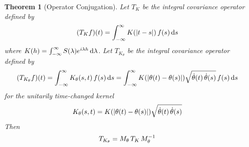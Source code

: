 \documentclass{article}
\newtheorem{theorem}{Theorem}
\begin{document}
\begin{theorem}[Operator Conjugation]
  \label{thm:operator_conjugation}Let $T_K$ be the integral covariance
  operator defined by
  \begin{equation}
    \label{eq:integral_op_original} (T_K f) (t) = \int_{- \infty}^{\infty} K
    (|t - s|)  \hspace{0.17em} f (s) \hspace{0.17em} \mathrm{d} s
  \end{equation}
  where $K (h) = \int_{- \infty}^{\infty} S (\lambda) e^{i \lambda h}
  \hspace{0.17em} \mathrm{d} \lambda$. Let $T_{K_{\theta}}$ be the integral
  covariance operator defined by
  \begin{equation}
    \label{eq:integral_op_transformed} (T_{K_{\theta}} f) (t) = \int_{-
    \infty}^{\infty} K_{\theta} (s, t)  \hspace{0.17em} f (s) \hspace{0.17em}
    \mathrm{d} s = \int_{- \infty}^{\infty} K (| \theta (t) - \theta (s) |)
    \sqrt{\dot{\theta} (t)  \hspace{0.17em} \dot{\theta} (s)}  \hspace{0.17em}
    f (s) \hspace{0.17em} \mathrm{d} s
  \end{equation}
  for the unitarily time-changed kernel
  \begin{equation}
    K_{\theta} (s, t) = K (| \theta (t) - \theta (s) |) \sqrt{\dot{\theta} (t)
    \hspace{0.17em} \dot{\theta} (s)}
  \end{equation}
  Then
  \begin{equation}
    \label{eq:conjugation} T_{K_{\theta}} = M_{\theta}  \hspace{0.17em} T_K 
    \hspace{0.17em} M_{\theta}^{- 1}
  \end{equation}
\end{theorem}
\end{document}
